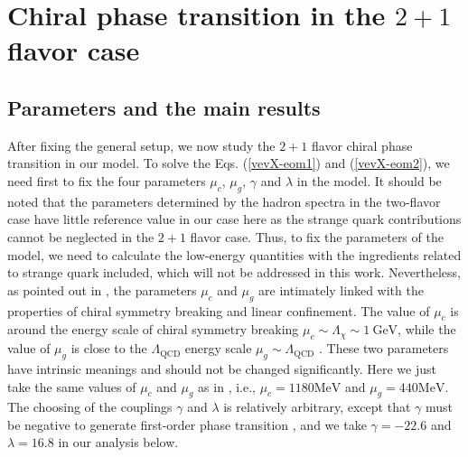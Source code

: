 \documentclass[11pt,a4paper,psfrag]{article}
\begin{document}
\section{Chiral phase transition in the $2+1$ flavor case}\label{Chiphasetransit}

\subsection{Parameters and the main results}\label{parameters1}

After fixing the general setup, we now study the $2+1$ flavor chiral phase transition in our model. To solve the Eqs. (\ref{vevX-eom1}) and (\ref{vevX-eom2}), we need first to fix the four parameters $\mu_{c}$, $\mu_{g}$, $\gamma$ and $\lambda$ in the model. It should be noted that the parameters determined by the hadron spectra in the two-flavor case \cite{Fang:2016nfj} have little reference value in our case here as the strange quark contributions cannot be neglected in the $2+1$ flavor case. Thus, to fix the parameters of the model, we need to calculate the low-energy quantities with the ingredients related to strange quark included, which will not be addressed in this work. Nevertheless, as pointed out in \cite{Fang:2016nfj}, the parameters $\mu_{c}$ and $\mu_{g}$ are intimately linked with the properties of chiral symmetry breaking and linear confinement. The value of $\mu_{c}$ is around the energy scale of chiral symmetry breaking $\mu_c\sim \Lambda_{\chi} \sim 1~\mathrm{GeV}$, while the value of $\mu_{g}$ is close to the $\Lambda_{\mathrm{QCD}}$ energy scale $\mu_g \sim \Lambda_{\mathrm{QCD}}$ \cite{Shuryak:1988ck}. These two parameters have intrinsic meanings and should not be changed significantly. Here we just take the same values of $\mu_{c}$ and $\mu_{g}$ as in \cite{Fang:2016nfj}, i.e., $\mu_{c}=1180\mathrm{MeV}$ and $\mu_{g}=440\mathrm{MeV}$. The choosing of the couplings $\gamma$ and $\lambda$ is relatively arbitrary, except that $\gamma$ must be negative to generate first-order phase transition \cite{Chelabi:2015gpc}, and we take $\gamma=-22.6$ and $\lambda=16.8$ in our analysis below.
\end{document}
